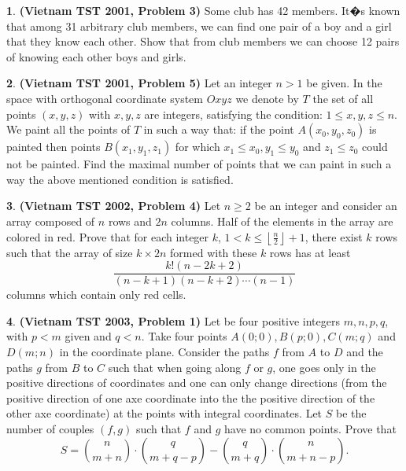 \documentclass{article}
\theoremstyle{definition}
\newtheorem{p}{}
\begin{document}
\begin{p}{\bf(Vietnam TST 2001, Problem 3)}
Some club has 42 members. It�s known that among 31 arbitrary club members, we can find one pair of a boy and a girl that they know each other. Show that from club members we can choose 12 pairs of knowing each other boys and girls.
\end{p}


\begin{p}{\bf(Vietnam TST 2001, Problem 5)}
Let an integer $n > 1$ be given. In the space with orthogonal coordinate system $Oxyz$ we denote by $T$  the set of all points $(x, y, z)$ with $x, y, z$ are integers, satisfying the condition: $1 \leq x, y, z \leq n$. We  paint all the points of $T$ in such a way that: if the point $A(x_0, y_0, z_0)$ is painted then points $B(x_1, y_1, z_1)$ for which $x_1 \leq x_0, y_1 \leq y_0$ and $z_1 \leq z_0$ could not be painted. Find the maximal number of points that we can paint in such a way the above mentioned condition is satisfied.
\end{p}






\begin{p}{\bf(Vietnam TST 2002, Problem 4)}
Let $n\geq 2$ be an integer and consider an array composed of $n$ rows and $2n$ columns. Half of the elements in the array are colored in red. Prove that for each integer $k$, $1<k\leq \left\lfloor \frac{n}{2}\right\rfloor+1$, there exist $k$ rows such that the array of size $k\times 2n$ formed with these $k$ rows has at least
\[ \frac{ k! (n-2k+2) }{(n-k+1)(n-k+2)\cdots (n-1)} \] 
columns which contain only red cells.
\end{p}




\begin{p}{\bf(Vietnam TST 2003, Problem 1)}
Let be four positive integers $m, n, p, q$, with $p < m$ given and $q < n$. Take four points $A(0; 0), B(p; 0), C (m; q)$ and $D(m; n)$ in the coordinate plane. Consider the paths $f$ from $A$ to $D$ and the paths $g$ from $B$ to $C$ such that when going along $f$ or $g$, one goes only in the positive directions of coordinates and one can only change directions (from the positive direction of one axe coordinate into the the positive direction of the other axe coordinate) at the points with integral coordinates. Let $S$ be the number of couples $(f, g)$ such that $f$ and $g$ have no common points. Prove that
\[S = \binom{n}{m+n} \cdot \binom{q}{m+q-p} - \binom{q}{m+q} \cdot \binom{n}{m+n-p}.\]
\end{p}
\end{document}
